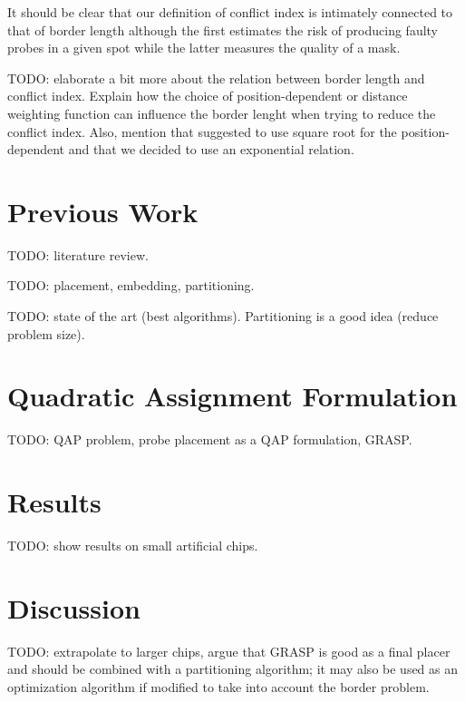 \documentclass{bioinfo}
\begin{document}
It should be clear that our definition of conflict index is intimately connected to that of border length although the first estimates the risk of producing faulty probes in a given spot while the latter measures the quality of a mask.

TODO: elaborate a bit more about the relation between border length and conflict index. Explain how the choice of position-dependent or distance weighting function can influence the border lenght when trying to reduce the conflict index. Also, mention that \citealp{KAHNG03_1} suggested to use square root for the position-dependent and that we decided to use an exponential relation.

\section{Previous Work}

TODO: literature review.

TODO: placement, embedding, partitioning.

TODO: state of the art (best algorithms). Partitioning is a good idea (reduce problem size).

\section{Quadratic Assignment Formulation}

TODO: QAP problem, probe placement as a QAP formulation, GRASP.

\section{Results}

TODO: show results on small artificial chips.

\section{Discussion}

TODO: extrapolate to larger chips, argue that GRASP is good as a final placer and should be combined with a partitioning algorithm; it may also be used as an optimization algorithm if modified to take into account the border problem.
\end{document}
